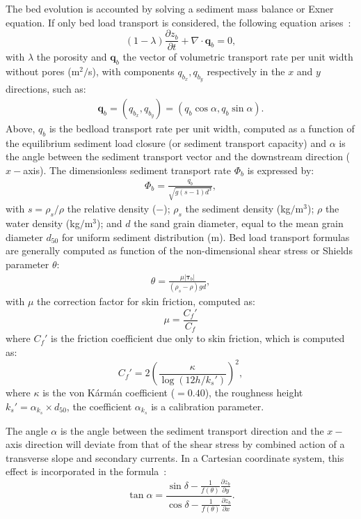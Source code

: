 The bed evolution is accounted by solving a sediment mass balance or Exner equation. If only bed load transport is considered, the following equation arises~\cite{doi:10.1061/9780784408148}:
\begin{equation}
\label{eq:exner}
(1-\lambda)\frac{\partial z_b}{\partial t} + \nabla\cdot \mathbf q_b = 0,
\end{equation}
with $\lambda$ the porosity and $\mathbf q_b$ the vector of volumetric transport rate per unit width without pores (m$^2/$s), with components $q_{b_x}, q_{b_y}$ respectively in the $x$ and $y$ directions, such as:
\begin{align}
\mathbf q_b = (q_{b_x}, q_{b_y}) = (q_b \cos\alpha, q_b \sin\alpha).
\label{eq:bedloadtransportvector}
\end{align}
Above, $q_b$ is the bedload transport rate per unit width, computed as a function of the equilibrium sediment load closure (or sediment transport capacity) and $\alpha$ is the angle between the sediment transport vector and the downstream direction ($x-$axis).
The dimensionless sediment transport rate $\Phi_b$ is expressed by:
\begin{align}
\Phi_b = \frac{q_b}{\sqrt{g(s-1)d^3}},
\label{eq:Phis}
\end{align}
with $s=\rho_s/\rho$ the relative density ($-$); $\rho_s$ the sediment density (kg$/$m$^3$); $\rho$ the water density (kg$/$m$^3$); and $d$ the sand grain diameter, equal to the mean grain diameter $d_{50}$ for uniform sediment distribution (m).
Bed load transport formulas are generally computed as function of the non-dimensional shear stress or Shields parameter $\theta$:
\begin{align}
\theta=\frac{\mu|\boldsymbol\tau_b|}{(\rho_s-\rho)gd}, 
\label{eq:shieldsp}
\end{align}
with $\mu$ the correction factor for skin friction, computed as:
\begin{equation}\label{eq:mu}
\mu=\frac{C_f'}{C_f}
\end{equation}
where $C_f'$ is the friction coefficient due only to skin friction, which is computed as:
\begin{equation}\label{eq:cfp}
C_f'=2\left(\frac{\kappa}{\log(12h/k_s')}\right)^2,
\end{equation}
where $\kappa$ is the von K\'arm\'an coefficient ($=0.40$), the roughness height $k_s'=\alpha_{k_s}\times d_{50}$, the coefficient $\alpha_{k_s}$ is a calibration parameter.

The angle $\alpha$ is the angle between the sediment transport direction and the $x-$axis direction will deviate from that of the shear stress by combined action of a transverse slope and secondary currents. In a Cartesian coordinate system, this effect is incorporated in the formula~\cite{doi:10.1080/00221688509499377}:
\begin{equation}
\displaystyle
\tan\alpha = \frac{\sin\delta-\frac{1}{f(\theta)}\frac{\partial z_b}{\partial y}}{\cos\delta-\frac{1}{f(\theta)}\frac{\partial z_b}{\partial x}}.
\end{equation}

